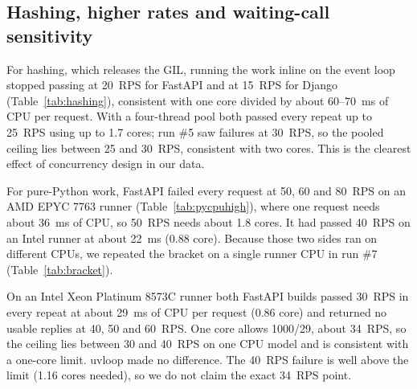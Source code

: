 \documentclass[journal]{IEEEtran}
\begin{document}
\subsection{Hashing, higher rates and waiting-call sensitivity}\label{sec:followup}

For hashing, which releases the GIL, running the work inline on the event loop stopped passing at 20~RPS for FastAPI and at 15~RPS for Django (Table~\ref{tab:hashing}), consistent with one core divided by about 60--70~ms of CPU per request. With a four-thread pool both passed every repeat up to 25~RPS using up to 1.7 cores; run \#5 saw failures at 30~RPS, so the pooled ceiling lies between 25 and 30~RPS, consistent with two cores. This is the clearest effect of concurrency design in our data.

For pure-Python work, FastAPI failed every request at 50, 60 and 80~RPS on an AMD EPYC 7763 runner (Table~\ref{tab:pycpuhigh}), where one request needs about 36~ms of CPU, so 50~RPS needs about 1.8 cores. It had passed 40~RPS on an Intel runner at about 22~ms (0.88 core). Because those two sides ran on different CPUs, we repeated the bracket on a single runner CPU in run \#7 (Table~\ref{tab:bracket}).

On an Intel Xeon Platinum 8573C runner both FastAPI builds passed 30~RPS in every repeat at about 29~ms of CPU per request (0.86 core) and returned no usable replies at 40, 50 and 60~RPS. One core allows 1000/29, about 34~RPS, so the ceiling lies between 30 and 40~RPS on one CPU model and is consistent with a one-core limit. uvloop made no difference. The 40~RPS failure is well above the limit (1.16 cores needed), so we do not claim the exact 34~RPS point.
\end{document}
